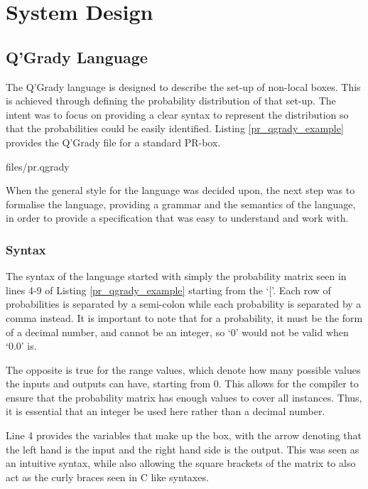\documentclass[report.tex]{subfiles}
\begin{document}
\chapter{System Design} %
\label{cha:system_design}
\section{Q'Grady Language} %
\label{sec:q_grady_language}
The Q'Grady language is designed to describe the set-up of non-local boxes.
This is achieved through defining the probability distribution of that set-up.
The intent was to focus on providing a clear syntax to represent the distribution
so that the probabilities could be easily identified.
Listing \ref{pr_qgrady_example} provides the Q'Grady file for a standard PR-box.


{files/pr.qgrady} 

When the general style for the language was decided upon, the next step was to
formalise the language, providing a grammar and the semantics of the language,
in order to provide a specification that was easy to understand and work with.

\subsection{Syntax} %
\label{sub:syntax}
The syntax of the language started with simply the probability matrix seen in
lines 4-9 of Listing \ref{pr_qgrady_example} starting from the `['. Each row of
probabilities is separated by a semi-colon while each probability is separated
by a comma instead. It is important to note that for a probability, it must be
the form of a decimal number, and cannot be an integer, so `0' would not be
valid when `0.0' is.

The opposite is true for the range values, which denote how many possible values
the inputs and outputs can have, starting from 0. This allows for the compiler
to ensure that the probability matrix has enough values to cover all instances.
Thus, it is essential that an integer be used here rather than a decimal number.

Line 4 provides the variables that make up the box, with the arrow denoting that
the left hand is the input and the right hand side is the output. This was seen
as an intuitive syntax, while also allowing the square brackets of the matrix to
also act as the curly braces seen in C like syntaxes.
\end{document}
